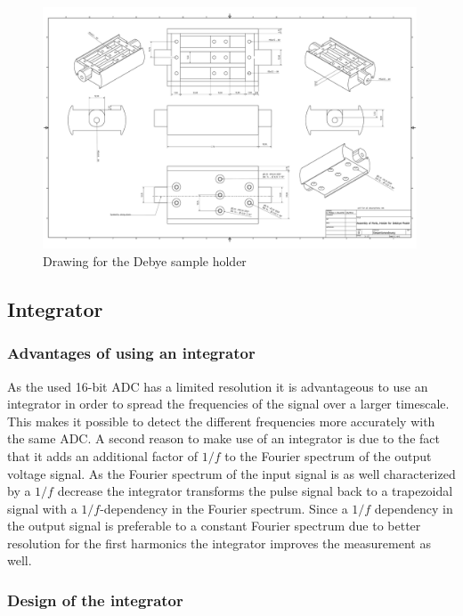    
   \begin{figure}
\includegraphics[width=0.99\textwidth]{figures/Gesamtanordnung.pdf}
    \caption{Drawing for the Debye sample holder}
    \label{fig.CADdrawing}
   \end{figure}

\subsection{Integrator}
\subsubsection{Advantages of using an integrator}
As the used 16-bit ADC has a limited resolution it is advantageous to use an integrator in order to spread the frequencies of the signal over a larger timescale. This makes it possible to detect the different frequencies more accurately with the same ADC. 
A second reason to make use of an integrator is due to the fact that it adds an additional factor of $1/f$ to the Fourier spectrum of the output voltage signal. As the Fourier spectrum of the input signal is as well characterized by a $1/f$ decrease the integrator transforms the pulse signal back to a trapezoidal signal with a $1/f$-dependency in the Fourier spectrum. Since a $1/f$ dependency in the output signal is preferable to a constant Fourier spectrum due to better resolution for the first harmonics the integrator improves the measurement as well. 

\subsubsection{Design of the integrator}
